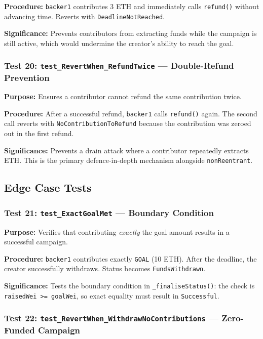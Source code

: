 \textbf{Procedure:} \texttt{backer1} contributes 3 ETH and immediately calls \texttt{refund()} without advancing time. Reverts with \texttt{DeadlineNotReached}.

\textbf{Significance:} Prevents contributors from extracting funds while the campaign is still active, which would undermine the creator's ability to reach the goal.

\subsubsection{Test 20: \texttt{test\_RevertWhen\_RefundTwice} --- Double-Refund Prevention}

\textbf{Purpose:} Ensures a contributor cannot refund the same contribution twice.

\textbf{Procedure:} After a successful refund, \texttt{backer1} calls \texttt{refund()} again. The second call reverts with \texttt{NoContributionToRefund} because the contribution was zeroed out in the first refund.

\textbf{Significance:} Prevents a drain attack where a contributor repeatedly extracts ETH. This is the primary defence-in-depth mechanism alongside \texttt{nonReentrant}.

\subsection{Edge Case Tests}

\subsubsection{Test 21: \texttt{test\_ExactGoalMet} --- Boundary Condition}

\textbf{Purpose:} Verifies that contributing \emph{exactly} the goal amount results in a successful campaign.

\textbf{Procedure:} \texttt{backer1} contributes exactly \texttt{GOAL} (10 ETH). After the deadline, the creator successfully withdraws. Status becomes \texttt{FundsWithdrawn}.

\textbf{Significance:} Tests the boundary condition in \texttt{\_finaliseStatus()}: the check is \texttt{raisedWei >= goalWei}, so exact equality must result in \texttt{Successful}.

\subsubsection{Test 22: \texttt{test\_RevertWhen\_WithdrawNoContributions} --- Zero-Funded Campaign}


